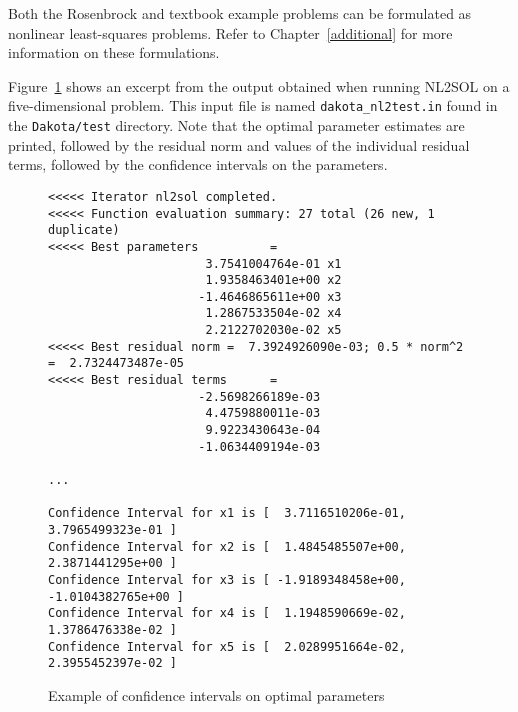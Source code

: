 Both the Rosenbrock and textbook example problems can be formulated as
nonlinear least-squares problems. Refer to Chapter~\ref{additional}
for more information on these formulations.
%

Figure~\ref{nls:figure02} shows an excerpt from the output 
obtained when running NL2SOL on a five-dimensional problem. 
This input file is named \texttt{dakota\_nl2test.in} found 
in the \texttt{Dakota/test} directory. 
Note that the optimal parameter estimates are printed, 
followed by the residual norm and values of the individual 
residual terms, followed by the confidence intervals on the parameters. 

\begin{figure}
\begin{bigbox}
\begin{small}
\begin{verbatim}
<<<<< Iterator nl2sol completed.
<<<<< Function evaluation summary: 27 total (26 new, 1 duplicate)
<<<<< Best parameters          =
                      3.7541004764e-01 x1
                      1.9358463401e+00 x2
                     -1.4646865611e+00 x3
                      1.2867533504e-02 x4
                      2.2122702030e-02 x5
<<<<< Best residual norm =  7.3924926090e-03; 0.5 * norm^2 =  2.7324473487e-05
<<<<< Best residual terms      =
                     -2.5698266189e-03
                      4.4759880011e-03
                      9.9223430643e-04
                     -1.0634409194e-03

...

Confidence Interval for x1 is [  3.7116510206e-01,  3.7965499323e-01 ]
Confidence Interval for x2 is [  1.4845485507e+00,  2.3871441295e+00 ]
Confidence Interval for x3 is [ -1.9189348458e+00, -1.0104382765e+00 ]
Confidence Interval for x4 is [  1.1948590669e-02,  1.3786476338e-02 ]
Confidence Interval for x5 is [  2.0289951664e-02,  2.3955452397e-02 ]

\end{verbatim}
\end{small}
\end{bigbox}
\caption{Example of confidence intervals on optimal parameters}
\label{nls:figure02}
\end{figure}

